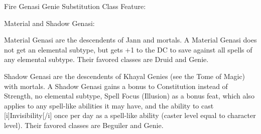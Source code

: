Fire Genasi Genie Substitution Class Feature:


Material and Shadow Genasi:

Material Genasi are the descendents of Jann and mortals.  A Material Genasi does not get an elemental subtype, but gets +1 to the DC to save against all spells of any elemental subtype.  Their favored classes are Druid and Genie.

Shadow Genasi are the descendents of Khayal Genies (see the Tome of Magic) with mortals.  A Shadow Genasi gains a bonus to Constitution instead of Strength, no elemental subtype, Spell Focus (Illusion) as a bonus feat, which also applies to any spell-like abilities it may have, and the ability to cast [i]Invisibility[/i] once per day as a spell-like ability (caster level equal to character level).  Their favored classes are Beguiler and Genie.